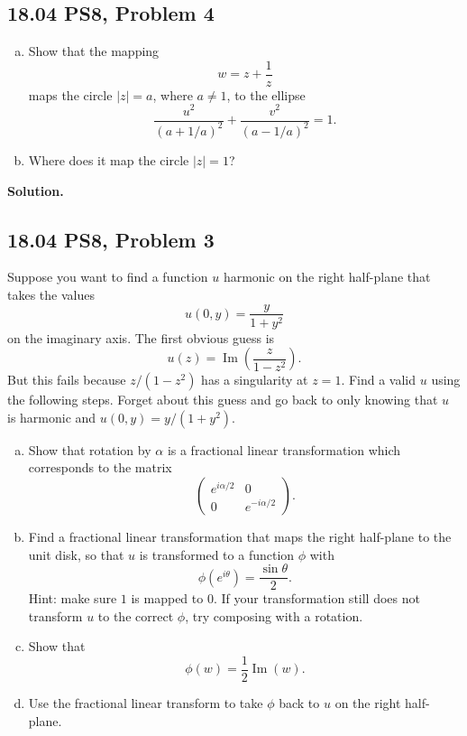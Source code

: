 \documentclass{article}
\renewcommand{\Im}{\operatorname{Im}}
\newenvironment{solution}{%
  \par\medskip\noindent\textbf{Solution.}\par
}{\par\medskip}
\begin{document}
\subsection*{18.04 PS8, Problem 4}

\begin{enumerate}[(a)]
  \item Show that the mapping
  \[
    w=z+\frac{1}{z}
  \]
  maps the circle $|z|=a$, where $a\ne 1$, to the ellipse
  \[
    \frac{u^2}{(a+1/a)^2}+\frac{v^2}{(a-1/a)^2}=1.
  \]

  \item Where does it map the circle $|z|=1$?
\end{enumerate}

\begin{solution}
\end{solution}

\subsection*{18.04 PS8, Problem 3}

Suppose you want to find a function $u$ harmonic on the right half-plane that
takes the values
\[
  u(0,y)=\frac{y}{1+y^2}
\]
on the imaginary axis. The first obvious guess is
\[
  u(z)=\Im\left(\frac{z}{1-z^2}\right).
\]
But this fails because $z/(1-z^2)$ has a singularity at $z=1$. Find a valid
$u$ using the following steps. Forget about this guess and go back to only
knowing that $u$ is harmonic and $u(0,y)=y/(1+y^2)$.

\begin{enumerate}[(a)]
  \item Show that rotation by $\alpha$ is a fractional linear transformation
  which corresponds to the matrix
  \[
    \begin{pmatrix}
      e^{i\alpha/2} & 0\\
      0 & e^{-i\alpha/2}
    \end{pmatrix}.
  \]

  \item Find a fractional linear transformation that maps the right half-plane
  to the unit disk, so that $u$ is transformed to a function $\phi$ with
  \[
    \phi(e^{i\theta})=\frac{\sin\theta}{2}.
  \]
  Hint: make sure $1$ is mapped to $0$. If your transformation still does not
  transform $u$ to the correct $\phi$, try composing with a rotation.

  \item Show that
  \[
    \phi(w)=\frac{1}{2}\Im(w).
  \]

  \item Use the fractional linear transform to take $\phi$ back to $u$ on the
  right half-plane.
\end{enumerate}
\end{document}
